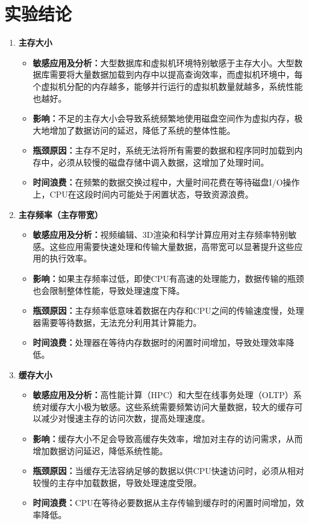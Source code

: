 \documentclass{article}
\begin{document}
\section{实验结论}
\begin{enumerate}
  \item \textbf{主存大小}
  \begin{itemize}
      \item \textbf{敏感应用及分析：}大型数据库和虚拟机环境特别敏感于主存大小。大型数据库需要将大量数据加载到内存中以提高查询效率，而虚拟机环境中，每个虚拟机分配的内存越多，能够并行运行的虚拟机数量就越多，系统性能也越好。
      \item \textbf{影响：}不足的主存大小会导致系统频繁地使用磁盘空间作为虚拟内存，极大地增加了数据访问的延迟，降低了系统的整体性能。
      \item \textbf{瓶颈原因：}主存不足时，系统无法将所有需要的数据和程序同时加载到内存中，必须从较慢的磁盘存储中调入数据，这增加了处理时间。
      \item \textbf{时间浪费：}在频繁的数据交换过程中，大量时间花费在等待磁盘I/O操作上，CPU在这段时间内可能处于闲置状态，导致资源浪费。
  \end{itemize}
  
  \item \textbf{主存频率（主存带宽）}
  \begin{itemize}
      \item \textbf{敏感应用及分析：}视频编辑、3D渲染和科学计算应用对主存频率特别敏感。这些应用需要快速处理和传输大量数据，高带宽可以显著提升这些应用的执行效率。
      \item \textbf{影响：}如果主存频率过低，即使CPU有高速的处理能力，数据传输的瓶颈也会限制整体性能，导致处理速度下降。
      \item \textbf{瓶颈原因：}主存频率低意味着数据在内存和CPU之间的传输速度慢，处理器需要等待数据，无法充分利用其计算能力。
      \item \textbf{时间浪费：}处理器在等待内存数据时的闲置时间增加，导致处理效率降低。
  \end{itemize}
  
  \item \textbf{缓存大小}
  \begin{itemize}
      \item \textbf{敏感应用及分析：}高性能计算（HPC）和大型在线事务处理（OLTP）系统对缓存大小极为敏感。这些系统需要频繁访问大量数据，较大的缓存可以减少对慢速主存的访问次数，提高处理速度。
      \item \textbf{影响：}缓存大小不足会导致高缓存失效率，增加对主存的访问需求，从而增加数据访问延迟，降低系统性能。
      \item \textbf{瓶颈原因：}当缓存无法容纳足够的数据以供CPU快速访问时，必须从相对较慢的主存中加载数据，导致处理速度受限。
      \item \textbf{时间浪费：}CPU在等待必要数据从主存传输到缓存时的闲置时间增加，效率降低。
  \end{itemize}
  

\end{enumerate}
\end{document}
